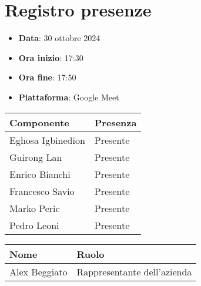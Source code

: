 \documentclass[a4paper, 12pt]{article}
\begin{document}
\section{Registro presenze}
\begin{itemize}
    \item[] \textbf{Data}: 30 ottobre 2024
    \item[] \textbf{Ora inizio}:  17:30
    \item[] \textbf{Ora fine}: 17:50
    \item[] \textbf{Piattaforma}: Google Meet	
\end{itemize}
\begin{table}[!h]
\centering
{\renewcommand{\arraystretch}{2}
\begin{tabularx}{\textwidth}{| X | X |}
    \hline
        \textbf{\large Componente} & 
        \textbf{\large Presenza} \\ 
    \hline 
    \hline
        Eghosa Igbinedion&
        Presente \\
    \hline 
        Guirong Lan&
        Presente \\
    \hline 
        Enrico Bianchi&
        Presente \\
    \hline 
        Francesco Savio&
        Presente \\
    \hline 
        Marko Peric&
        Presente \\
    \hline 
        Pedro Leoni&
        Presente \\
    \hline 

\end{tabularx}}
\end{table}

\begin{table}[!h]
    \centering
    {\renewcommand{\arraystretch}{2}
    \begin{tabularx}{\textwidth}{| X | X |}
        \hline
            \textbf{\large Nome} & 
            \textbf{\large Ruolo} \\ 
        \hline 
        \hline
            Alex Beggiato&
            Rappresentante dell'azienda \\
        \hline 
    
    \end{tabularx}}
\end{table}

\newpage
\end{document}
